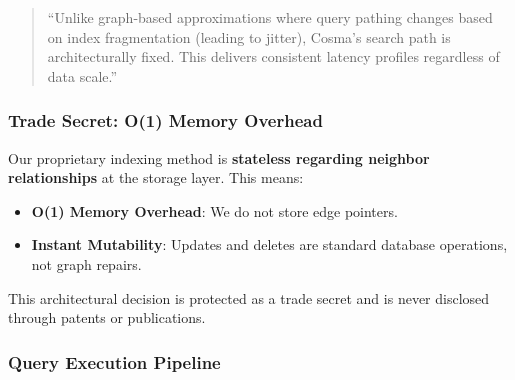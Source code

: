 \begin{quote}
``Unlike graph-based approximations where query pathing changes based on index fragmentation (leading to jitter), Cosma's search path is architecturally fixed. This delivers consistent latency profiles regardless of data scale.''
\end{quote}

\subsubsection{Trade Secret: O(1) Memory Overhead}

Our proprietary indexing method is \textbf{stateless regarding neighbor relationships} at the storage layer. This means:

\begin{itemize}
    \item \textbf{O(1) Memory Overhead}: We do not store edge pointers.
    \item \textbf{Instant Mutability}: Updates and deletes are standard database operations, not graph repairs.
\end{itemize}

This architectural decision is protected as a trade secret and is never disclosed through patents or publications.

\subsubsection{Query Execution Pipeline}

